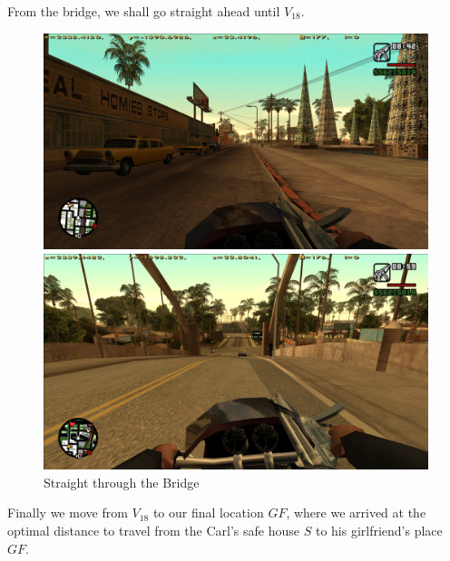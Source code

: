 \documentclass{article}
\begin{document}
	From the bridge, we shall go straight ahead until \(V_18\).
	\clearpage
	\begin{figure}[!h]
		\centering
		\begin{minipage}{\textwidth}
			\centering
			\includegraphics[width=1\textwidth]{./0img/path3.png}
		\end{minipage}
		\hfill
		\begin{minipage}{\textwidth}
			\centering
			\includegraphics[width= 1\textwidth]{./0img/path4.png}
		\end{minipage}
		\caption{Straight through the Bridge}
	\end{figure} Finally we move from \(V_{18}\) to our final location \(GF\), where we arrived at the optimal distance to travel from the Carl's safe house \(S\) to his girlfriend's place \(GF\).
	\clearpage
\end{document}
